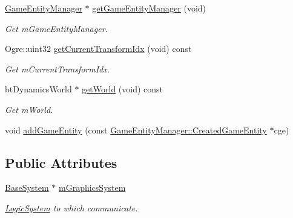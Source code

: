 \begin{DoxyCompactItemize}
\mbox{\label{class_common_1_1_logic_system_a957d149fb5f02d2d00ec4a4a1827fc2e}} 
\hyperlink{class_common_1_1_game_entity_manager}{Game\+Entity\+Manager} $\ast$ \hyperlink{class_common_1_1_logic_system_a957d149fb5f02d2d00ec4a4a1827fc2e}{get\+Game\+Entity\+Manager} (void)
\begin{DoxyCompactList}\small\item\em Get m\+Game\+Entity\+Manager. \end{DoxyCompactList}\item 
\mbox{\label{class_common_1_1_logic_system_a175efaf2f8faf4949e9141cb90a477ce}} 
Ogre\+::uint32 \hyperlink{class_common_1_1_logic_system_a175efaf2f8faf4949e9141cb90a477ce}{get\+Current\+Transform\+Idx} (void) const
\begin{DoxyCompactList}\small\item\em Get m\+Current\+Transform\+Idx. \end{DoxyCompactList}\item 
\mbox{\label{class_common_1_1_logic_system_a1172de6e34685a951f956235ca10ca52}} 
bt\+Dynamics\+World $\ast$ \hyperlink{class_common_1_1_logic_system_a1172de6e34685a951f956235ca10ca52}{get\+World} (void) const
\begin{DoxyCompactList}\small\item\em Get m\+World. \end{DoxyCompactList}\item 
void \hyperlink{class_common_1_1_logic_system_a8ff1976c824aab7d67481390b5e81a4d}{add\+Game\+Entity} (const \hyperlink{struct_common_1_1_game_entity_manager_1_1_created_game_entity}{Game\+Entity\+Manager\+::\+Created\+Game\+Entity} $\ast$cge)
\end{DoxyCompactItemize}
\subsection*{Public Attributes}
\begin{DoxyCompactItemize}
\item 
\mbox{\label{class_common_1_1_logic_system_a0b7ac4ad3cc62da7681f649ad6e9823d}} 
\hyperlink{class_common_1_1_base_system}{Base\+System} $\ast$ \hyperlink{class_common_1_1_logic_system_a0b7ac4ad3cc62da7681f649ad6e9823d}{m\+Graphics\+System}
\begin{DoxyCompactList}\small\item\em \hyperlink{class_common_1_1_logic_system}{Logic\+System} to which communicate. \end{DoxyCompactList}\end{DoxyCompactItemize}
